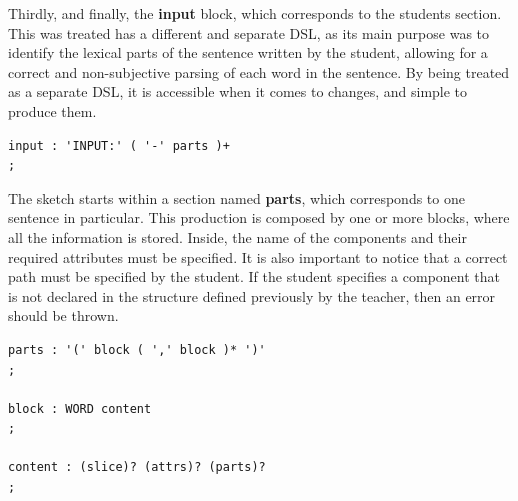 Thirdly, and finally, the \textbf{input} block, which corresponds to the students section. This was treated has a different and separate \textsc{DSL}, as its main purpose was to identify the lexical parts of the sentence written 
by the student, allowing for a correct and non-subjective parsing of each word in the sentence. By being treated as a separate \textsc{DSL}, it is accessible when it comes to changes, and simple to produce them.

\begin{center}
\begin{minipage}{8cm}
\begin{Verbatim}[frame=single, framesep=2mm]
input : 'INPUT:' ( '-' parts )+
;
\end{Verbatim}
\end{minipage}
\end{center}


The sketch starts within a section named \textbf{parts}, which corresponds to one sentence in particular. This production is composed by one or more blocks, where all the information is stored. Inside, the name of the components and their required attributes must be specified. It is also important to notice that a correct path must be specified by the student. If the student specifies a component that is not declared in the structure defined previously by the teacher, then an error should be thrown.

\begin{center}
\begin{minipage}{9cm}
\begin{Verbatim}[frame=single, framesep=2mm]
parts : '(' block ( ',' block )* ')'
;

block : WORD content
;

content : (slice)? (attrs)? (parts)?
;
\end{Verbatim}
\end{minipage}
\end{center}


